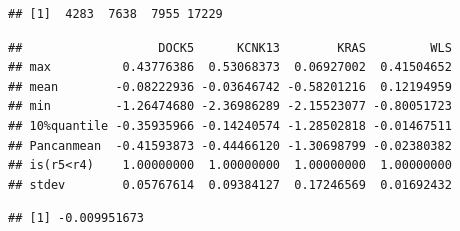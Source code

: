 \documentclass[
]{article}
\begin{document}
\begin{verbatim}
## [1]  4283  7638  7955 17229
\end{verbatim}

\begin{verbatim}
##                   DOCK5      KCNK13        KRAS         WLS
## max          0.43776386  0.53068373  0.06927002  0.41504652
## mean        -0.08222936 -0.03646742 -0.58201216  0.12194959
## min         -1.26474680 -2.36986289 -2.15523077 -0.80051723
## 10%quantile -0.35935966 -0.14240574 -1.28502818 -0.01467511
## Pancanmean  -0.41593873 -0.44466120 -1.30698799 -0.02380382
## is(r5<r4)    1.00000000  1.00000000  1.00000000  1.00000000
## stdev        0.05767614  0.09384127  0.17246569  0.01692432
\end{verbatim}

\begin{verbatim}
## [1] -0.009951673
\end{verbatim}
\end{document}
